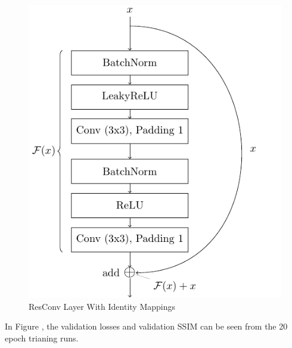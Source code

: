 \begin{figure}[h!]
    \centering
    \includegraphics[]{figures/model_architecture/build/residual_conv_with_im_layer.pdf}
    \caption{ResConv Layer With Identity Mappings \parencite{IdentityMappings}}
\end{figure}

In Figure , the validation losses and validation SSIM can be seen from the 20 epoch trianing runs.

